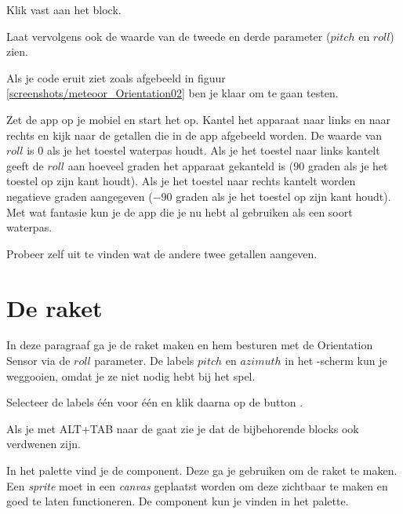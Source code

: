 \begin{opgave}
    \opgVraag
  Klik  vast aan het  block.
  
	Laat vervolgens ook de waarde van de tweede en derde parameter ($pitch$ en $roll$) zien.
\end{opgave}

Als je code eruit ziet zoals afgebeeld in figuur \ref{screenshots/meteoor_Orientation02} ben je klaar om te gaan testen.

\runOpTelefoon{}
Zet de app op je mobiel en start het op. Kantel het apparaat naar links en naar rechts en kijk naar de getallen die in de app afgebeeld worden. De waarde van $roll$ is $0$ als je het toestel waterpas houdt. Als je het toestel naar links kantelt geeft de $roll$ aan hoeveel graden het apparaat gekanteld is ($90$ graden als je het toestel op zijn kant houdt). Als je het toestel naar rechts kantelt worden negatieve graden aangegeven ($-90$ graden als je het toestel op zijn kant houdt). Met wat fantasie kun je de app die je nu hebt al gebruiken als een soort waterpas.


\begin{opgave}
    \opgVraag
	Probeer zelf uit te vinden wat de andere twee getallen aangeven.
\end{opgave}

\section{De raket}
In deze paragraaf ga je de raket maken en hem besturen met de Orientation Sensor via de $roll$ parameter. De labels $pitch$ en $azimuth$ in het -scherm kun je weggooien, omdat je ze niet nodig hebt bij het spel.

\begin{opgave}
    \opgVraag
  Selecteer de labels \'e\'en voor \'e\'en en klik daarna op de button .

  Als je met ALT+TAB naar de  gaat zie je dat de bijbehorende blocks ook verdwenen zijn. 
\end{opgave}

In het  palette vind je de  component. Deze ga je gebruiken om de raket te maken. Een \emph{sprite} moet in een \emph{canvas} geplaatst worden om deze zichtbaar te maken en goed te laten functioneren. De  component kun je vinden in het  palette.

